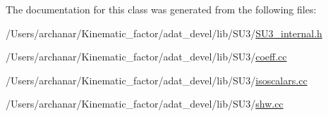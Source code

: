 The documentation for this class was generated from the following files\+:\begin{DoxyCompactItemize}
\item 
/\+Users/archanar/\+Kinematic\+\_\+factor/adat\+\_\+devel/lib/\+S\+U3/\mbox{\hyperlink{SU3__internal_8h}{S\+U3\+\_\+internal.\+h}}\item 
/\+Users/archanar/\+Kinematic\+\_\+factor/adat\+\_\+devel/lib/\+S\+U3/\mbox{\hyperlink{coeff_8cc}{coeff.\+cc}}\item 
/\+Users/archanar/\+Kinematic\+\_\+factor/adat\+\_\+devel/lib/\+S\+U3/\mbox{\hyperlink{isoscalars_8cc}{isoscalars.\+cc}}\item 
/\+Users/archanar/\+Kinematic\+\_\+factor/adat\+\_\+devel/lib/\+S\+U3/\mbox{\hyperlink{shw_8cc}{shw.\+cc}}\end{DoxyCompactItemize}
